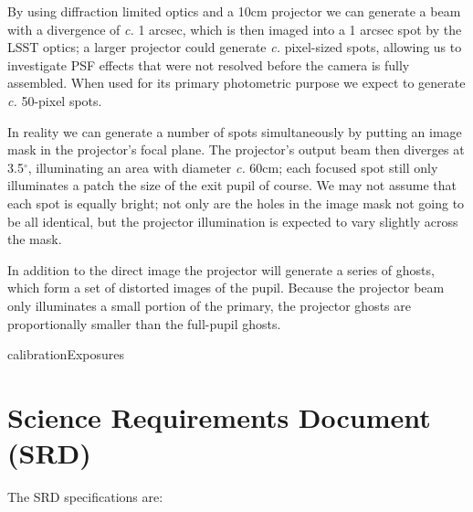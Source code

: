 \documentclass[12pt]{article}
\renewcommand{\c}{\textit{c.}\xspace}
\begin{document}
By using diffraction limited optics and a 10cm projector we can generate a beam with a divergence of \c 1
arcsec, which is then imaged into a 1 arcsec spot by the LSST optics; a larger projector could generate
\c pixel-sized spots, allowing us to investigate PSF effects that were not resolved before the camera
is fully assembled.  When used for its primary photometric purpose we expect to generate \c 50-pixel
spots.

In reality we can generate a number of spots simultaneously by putting an image mask in the projector's focal
plane.  The projector's output beam then diverges at 3.5$^\circ$, illuminating an area with diameter \c 60cm;
each focused spot still only illuminates a patch the size of the exit pupil of course.  We may not assume that
each spot is equally bright; not only are the holes in the image mask not going to be all identical, but the
projector illumination is expected to vary slightly across the mask.

In addition to the direct image the projector will generate a series of ghosts, which form a set
of distorted images of the pupil.  Because the projector beam only illuminates a small portion of
the primary, the projector ghosts are proportionally smaller than the full-pupil ghosts.

{calibrationExposures}

\section{Science Requirements Document (SRD)}
\label{appSRD}

The SRD specifications are:
\end{document}
